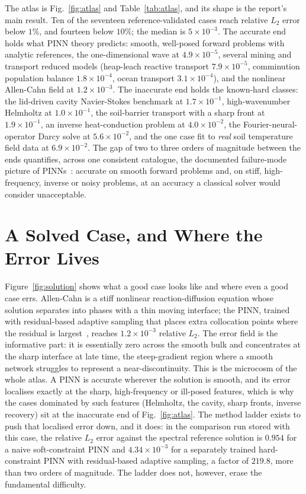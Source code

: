 \documentclass[journal]{IEEEtran}
\begin{document}
The atlas is Fig.~\ref{fig:atlas} and Table~\ref{tab:atlas}, and its shape is the report's main result. Ten of
the seventeen reference-validated cases reach relative $L_2$ error below $1\%$, and fourteen below $10\%$; the
median is $5\times10^{-3}$. The accurate end holds what PINN theory predicts: smooth, well-posed
forward problems with analytic references, the one-dimensional wave at $4.9\times10^{-5}$, several mining and
transport reduced models (heap-leach reactive transport $7.9\times10^{-5}$, comminution population balance
$1.8\times10^{-4}$, ocean transport $3.1\times10^{-4}$), and the nonlinear Allen-Cahn field at $1.2\times10^{-3}$.
The inaccurate end holds the known-hard classes: the lid-driven cavity
Navier-Stokes benchmark at $1.7\times10^{-1}$, high-wavenumber Helmholtz at $1.0\times10^{-1}$, the soil-barrier
transport with a sharp front at $1.9\times10^{-1}$, an inverse heat-conduction problem at $4.0\times10^{-2}$, the
Fourier-neural-operator Darcy solve at $5.6\times10^{-2}$, and the one case fit to \emph{real} soil
temperature field data at $6.9\times10^{-2}$. The gap of two to three orders of magnitude between the ends
quantifies, across one consistent catalogue, the documented failure-mode picture of
PINNs~\cite{wang,krishnapriyan}: accurate on smooth forward problems and, on stiff, high-frequency, inverse or
noisy problems, at an accuracy a classical solver would consider unacceptable.

\section{A Solved Case, and Where the Error Lives}\label{sec:solution}

Figure~\ref{fig:solution} shows what a good case looks like and where even a good case errs. Allen-Cahn is a
stiff nonlinear reaction-diffusion equation whose solution separates into phases with a thin moving interface;
the PINN, trained with residual-based adaptive sampling that places extra collocation points where the residual
is largest~\cite{wu}, reaches $1.2\times10^{-3}$ relative $L_2$. The error field is the informative part: it is
essentially zero across the smooth bulk and concentrates at the sharp interface at late time, the steep-gradient
region where a smooth network struggles to represent a near-discontinuity. This is the microcosm of the whole
atlas. A PINN is accurate wherever the solution is smooth, and its error localises exactly at the sharp,
high-frequency or ill-posed features, which is why the cases dominated by such features (Helmholtz, the cavity,
sharp fronts, inverse recovery) sit at the inaccurate end of Fig.~\ref{fig:atlas}. The method ladder exists to
push that localised error down, and it does: in the comparison run stored with this case, the relative $L_2$ error
against the spectral reference solution is $0.954$ for a naive soft-constraint PINN and $4.34\times10^{-3}$ for a
separately trained hard-constraint PINN with residual-based adaptive sampling, a factor of $219.8$, more than two
orders of magnitude. The ladder does not, however, erase the fundamental difficulty.
\end{document}
